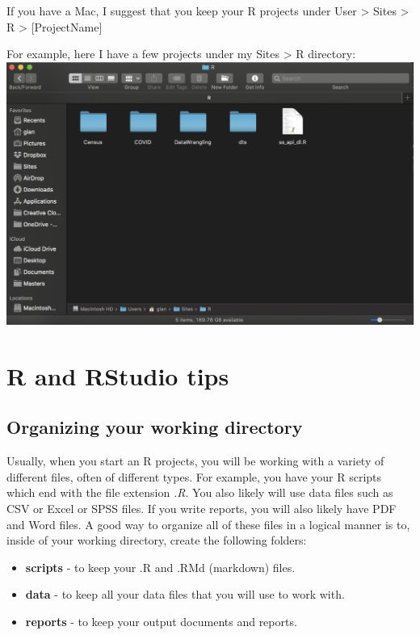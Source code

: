 \documentclass[]{book}
\providecommand{\tightlist}{%
  \setlength{\itemsep}{0pt}\setlength{\parskip}{0pt}}
\begin{document}
If you have a Mac, I suggest that you keep your R projects under User \textgreater{} Sites \textgreater{} R \textgreater{} {[}ProjectName{]}

For example, here I have a few projects under my Sites \textgreater{} R directory: \includegraphics{images/wd.png}

\hypertarget{r-and-rstudio-tips}{%
\section{R and RStudio tips}\label{r-and-rstudio-tips}}

\hypertarget{organizing-your-working-directory}{%
\subsection{Organizing your working directory}\label{organizing-your-working-directory}}

Usually, when you start an R projects, you will be working with a variety of different files, often of different types. For example, you have your R scripts which end with the file extension \emph{.R}. You also likely will use data files such as CSV or Excel or SPSS files. If you write reports, you will also likely have PDF and Word files. A good way to organize all of these files in a logical manner is to, inside of your working directory, create the following folders:

\begin{itemize}
\tightlist
\item
  \textbf{scripts} - to keep your .R and .RMd (markdown) files.
\item
  \textbf{data} - to keep all your data files that you will use to work with.
\item
  \textbf{reports} - to keep your output documents and reports.
\end{itemize}
\end{document}
